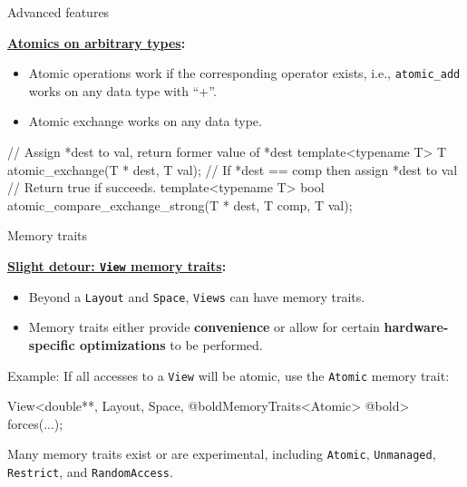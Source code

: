 \begin{frame}[fragile]{Advanced features}

\textbf{\ul{Atomics on arbitrary types}:}

\begin{itemize}
\item Atomic operations work if the corresponding operator exists,
  \hspace{50pt}i.e., \texttt{atomic\_add} works on any data type with ``+''.
\item {Atomic exchange works on any data type.}
\end{itemize}
\vspace{-10pt}
  \begin{code}[linebackgroundcolor={
      },
      keywords={}
    ]
// Assign *dest to val, return former value of *dest
template<typename T>
T atomic_exchange(T * dest, T val);
// If *dest == comp then assign *dest to val
// Return true if succeeds.
template<typename T>
bool atomic_compare_exchange_strong(T * dest, T comp, T val);
\end{code}

\end{frame}


\begin{frame}[fragile]{Memory traits}

  \textbf{\ul{Slight detour: \texttt{View} memory traits}:}

  \begin{itemize}
    \item Beyond a \texttt{Layout} and \texttt{Space}, \texttt{Views} can have memory traits.
    \item Memory traits either provide \textbf{convenience} or allow for certain \textbf{hardware-specific optimizations} to be performed.
  \end{itemize}

  Example: If all accesses to a \texttt{View} will be atomic, use the \texttt{Atomic} memory trait:

  \vspace{-2pt}
  \begin{code}[keywords={}]
    View<double**, Layout, Space,
         @boldMemoryTraits<Atomic> @bold> forces(...);
  \end{code}

  \vspace{5pt}
  \pause

  Many memory traits exist or are experimental, including \texttt{Atomic}, \texttt{Unmanaged}, \texttt{Restrict}, and \texttt{RandomAccess}.

  \vspace{-15pt}

\end{frame}

